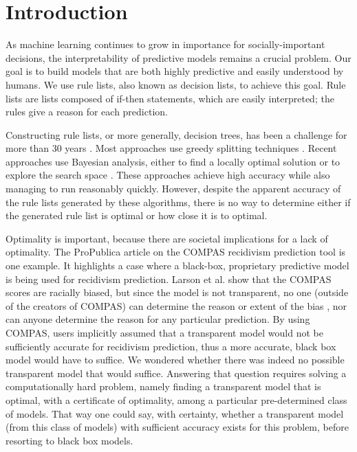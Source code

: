 %
%
%
%
%
%

\section{Introduction}

As machine learning continues to grow in importance for socially-important decisions, the interpretability of predictive models remains a crucial problem. Our goal is to build models that are both highly predictive and easily understood by humans. We use rule lists, also known as decision lists, to achieve this goal. Rule lists are lists composed of if-then statements, which are easily interpreted; the rules give a reason for each prediction.

Constructing rule lists, or more generally, decision trees, has been a challenge for more than
30 years \cite{Rivest87,Breiman84,Quinlan93}. Most approaches use greedy splitting techniques \cite{Rivest87,Breiman84,Quinlan93}. Recent approaches use Bayesian analysis, either to find a locally optimal solution \cite{Chipman:1998jh} or to explore the search space \citep{LethamRuMcMa15, YangRuSe16}. These approaches achieve high accuracy while also managing to run reasonably quickly. However, despite the apparent accuracy of the rule lists generated by these algorithms, there is no way to determine either if the generated rule list is optimal or how close it is to optimal.

Optimality is important, because there are societal implications for a lack of optimality. The ProPublica article on the COMPAS recidivism prediction tool \citep{LarsonMaKiAn16} is one example. It highlights a case where a black-box, proprietary predictive model is being used for recidivism prediction. Larson et al. show that the COMPAS scores are racially biased, but since the model is not transparent, no one (outside of the creators of COMPAS) can determine the reason or extent of the bias \citep{LarsonMaKiAn16}, nor can anyone determine the reason for any particular prediction.
%
By using COMPAS, users implicitly assumed that a transparent model
would not be sufficiently accurate for recidivism prediction,
thus a more accurate, black box model would have to suffice.
%
We wondered whether there was indeed no possible transparent model that would suffice. Answering that question requires solving a computationally hard problem, namely finding a transparent model that is optimal, with a certificate of optimality, among a particular pre-determined class of models. That way one could say, with certainty, whether a transparent model (from this class of models) with sufficient accuracy exists for this problem, before resorting to black box models.

